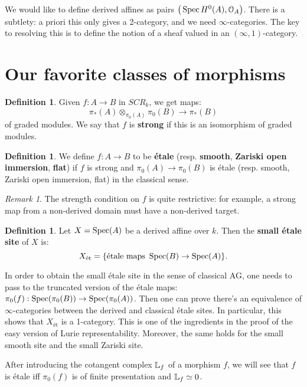 \documentclass[10pt,a4paper,reqno,oneside]{book} %
\theoremstyle{plain}
\theoremstyle{definition}
\newtheorem{defin}[thm]{Definition}
\theoremstyle{remark}
\newtheorem{rem}[thm]{Remark}
\numberwithin{equation}{section}
\begin{document}
We would like to define derived affines as pairs $\big(\operatorname{Spec} H^0(A), \mathcal{O}_A\big)$. There is a subtlety: a priori 
this only gives a 2-category, and we need $\infty$-categories.  The key to resolving this is to define the notion of a sheaf valued in an $(\infty,1)$-category.



\section{Our favorite classes of morphisms}
\begin{defin}
Given $f: A \to B$ in $SCR_k$, we get maps:
\[	\pi_*(A) \otimes_{\pi_0(A)} \pi_0(B) \to \pi_*(B)	\]
of graded modules. We say that $f$ is \textbf{strong} if this is an isomorphism of graded modules.
\end{defin}

\begin{defin}
\label{def:fav_morphisms}
We define $f: A \to B$ to be \textbf{\'{e}tale} (resp. \textbf{smooth}, \textbf{Zariski open immersion}, \textbf{flat})
if $f$ is strong and $\pi_0(A) \to \pi_0(B)$ is \'{e}tale (resp. smooth, Zariski open immersion, flat) in the classical sense.
\end{defin}

\begin{rem}
The strength condition on $f$ is quite restrictive: for example, a strong map from a non-derived domain must have a non-derived
target.
\end{rem}

\begin{defin}
Let $X = \operatorname{Spec}(A)$ be a derived affine over $k$. Then the \textbf{small \'{e}tale site} of $X$ is:
\[	X_{\text{\'{e}t}} = \{\text{\'{e}tale maps }\operatorname{Spec}(B) \to \operatorname{Spec}(A)\}.	\]
\end{defin}

In order to obtain the small \'{e}tale site in the sense of classical AG, one needs to pass to the truncated version
of the \'etale maps: $\pi_0(f) : \operatorname{Spec}(\pi_0(B)) \to \operatorname{Spec}(\pi_0(A))$. Then one can prove there's an equivalence of 
$\infty$-categories between the derived and classical \'etale sites. In particular, this shows that 
$X_{\text{\'{e}t}}$ is a 1-category. This is one of the ingredients in the proof of the easy version
of Lurie representability. Moreover, the same holds for the small smooth site and the small Zariski site.

After introducing the cotangent complex $\mathbb L_f$ of a morphism $f$, we will see that $f$ is \'{e}tale iff $\pi_0(f)$ 
is of finite presentation and $\mathbb L_f \simeq 0$.
\end{document}
